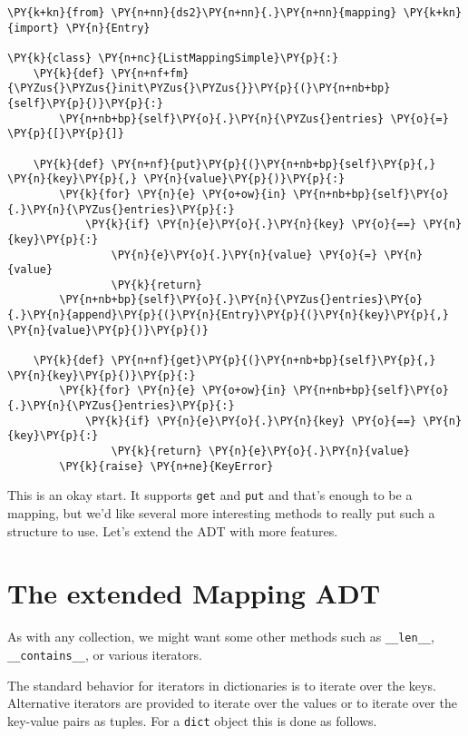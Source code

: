 \begin{Verbatim}[commandchars=\\\{\}]
\PY{k+kn}{from} \PY{n+nn}{ds2}\PY{n+nn}{.}\PY{n+nn}{mapping} \PY{k+kn}{import} \PY{n}{Entry}

\PY{k}{class} \PY{n+nc}{ListMappingSimple}\PY{p}{:}
    \PY{k}{def} \PY{n+nf+fm}{\PYZus{}\PYZus{}init\PYZus{}\PYZus{}}\PY{p}{(}\PY{n+nb+bp}{self}\PY{p}{)}\PY{p}{:}
        \PY{n+nb+bp}{self}\PY{o}{.}\PY{n}{\PYZus{}entries} \PY{o}{=} \PY{p}{[}\PY{p}{]}

    \PY{k}{def} \PY{n+nf}{put}\PY{p}{(}\PY{n+nb+bp}{self}\PY{p}{,} \PY{n}{key}\PY{p}{,} \PY{n}{value}\PY{p}{)}\PY{p}{:}
        \PY{k}{for} \PY{n}{e} \PY{o+ow}{in} \PY{n+nb+bp}{self}\PY{o}{.}\PY{n}{\PYZus{}entries}\PY{p}{:}
            \PY{k}{if} \PY{n}{e}\PY{o}{.}\PY{n}{key} \PY{o}{==} \PY{n}{key}\PY{p}{:}
                \PY{n}{e}\PY{o}{.}\PY{n}{value} \PY{o}{=} \PY{n}{value}
                \PY{k}{return}
        \PY{n+nb+bp}{self}\PY{o}{.}\PY{n}{\PYZus{}entries}\PY{o}{.}\PY{n}{append}\PY{p}{(}\PY{n}{Entry}\PY{p}{(}\PY{n}{key}\PY{p}{,} \PY{n}{value}\PY{p}{)}\PY{p}{)}

    \PY{k}{def} \PY{n+nf}{get}\PY{p}{(}\PY{n+nb+bp}{self}\PY{p}{,} \PY{n}{key}\PY{p}{)}\PY{p}{:}
        \PY{k}{for} \PY{n}{e} \PY{o+ow}{in} \PY{n+nb+bp}{self}\PY{o}{.}\PY{n}{\PYZus{}entries}\PY{p}{:}
            \PY{k}{if} \PY{n}{e}\PY{o}{.}\PY{n}{key} \PY{o}{==} \PY{n}{key}\PY{p}{:}
                \PY{k}{return} \PY{n}{e}\PY{o}{.}\PY{n}{value}
        \PY{k}{raise} \PY{n+ne}{KeyError}
\end{Verbatim}



This is an okay start.  It supports \texttt{get} and \texttt{put} and that's enough to be a mapping, but we'd like several more interesting methods to really put such a structure to use.  Let's extend the ADT with more features.

\section{The extended Mapping ADT}


As with any collection, we might want some other methods such as \texttt{\_\_len\_\_}, \texttt{\_\_contains\_\_}, or various iterators.  


The standard behavior for iterators in dictionaries is to iterate over the keys.  Alternative iterators are provided to iterate over the values or to iterate over the key-value pairs as tuples.  For a \texttt{dict} object this is done as follows.

